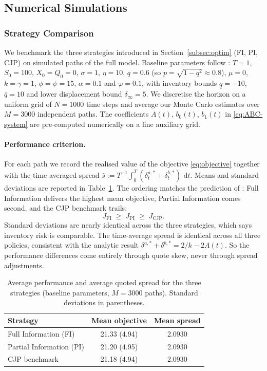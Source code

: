\documentclass[11pt,a4paper]{article}
\theoremstyle{plain}
\theoremstyle{definition}
\newcommand{\dd}{\,\mathrm{d}}
\begin{document}
\subsection{Numerical Simulations}
\label{subsec:numerics}

\subsubsection{Strategy Comparison}

We benchmark the three strategies introduced in
Section~\ref{subsec:optim} (FI, PI, CJP) on simulated paths of the full
model. Baseline parameters follow \cite{barucci2025market}: $T=1$,
$S_0=100$, $X_0=Q_0=0$, $\sigma=1$, $\eta=10$, $q=0.6$ (so
$p=\sqrt{1-q^2}\approx 0.8$), $\mu=0$, $k=\gamma=1$, $\phi=\psi=15$,
$\alpha=0.1$ and $\varphi=0.1$, with inventory bounds
$\underline{q}=-10$, $\bar{q}=10$ and lower displacement bound
$\delta_\infty=5$. We discretise the horizon on a uniform grid of
$N=1000$ time steps and average our Monte Carlo estimates over $M=3000$
independent paths. The coefficients $A(t)$, $b_0(t)$, $b_1(t)$ in
\eqref{eq:ABC-system} are pre-computed numerically on a fine auxiliary
grid.

\paragraph{Performance criterion.}
For each path we record the realised value of the objective
\eqref{eq:objective} together with the time-averaged spread
$\bar{s} := T^{-1}\!\int_0^T(\delta^{a,*}_t+\delta^{b,*}_t)\,\dd t$.
Means and standard deviations are reported in
Table~\ref{tab:perf-summary}. The ordering matches the prediction of
\cite{barucci2025market}: Full Information delivers the highest mean
objective, Partial Information comes second, and the CJP benchmark trails:
\[
  J_{\mathrm{FI}} \;\ge\; J_{\mathrm{PI}} \;\ge\; J_{\mathrm{CJP}}.
\]
Standard deviations are nearly identical across the three strategies,
which says inventory risk is comparable. The time-average spread is identical across all three
policies, consistent with the analytic result
$\delta^{a,*}+\delta^{b,*}=2/k-2A(t)$. So the performance differences
come entirely through quote skew, never through spread
adjustments.

\begin{table}[H]
  \centering
  \caption{Average performance and average quoted spread for the three
           strategies (baseline parameters, $M=3000$ paths). Standard
           deviations in parentheses.}
  \label{tab:perf-summary}
  \small
  \begin{tabular}{lcc}
    \toprule
    Strategy & Mean objective & Mean spread \\
    \midrule
    Full Information (FI)    & 21.33 (4.94) & 2.0930 \\
    Partial Information (PI) & 21.20 (4.95) & 2.0930 \\
    CJP benchmark            & 21.18 (4.94) & 2.0930 \\
    \bottomrule
  \end{tabular}
\end{table}
\end{document}
